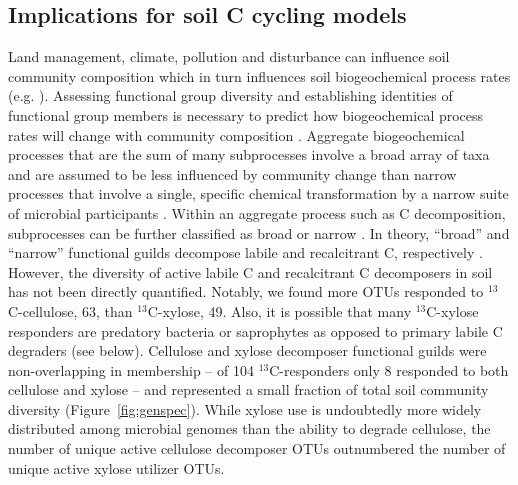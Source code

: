 \subsection{Implications for soil C cycling models}
Land management, climate, pollution and disturbance can influence soil
community composition \citep{McGuire2010} which in turn influences soil
biogeochemical process rates (e.g. \citep{Berlemont2014a}). Assessing
functional group diversity and establishing identities of functional group
members is necessary to predict how biogeochemical process rates will change
with community composition \citep{Schimel_1995,McGuire2010}. Aggregate
biogeochemical processes that are the sum of many subprocesses involve a broad
array of taxa and are assumed to be less influenced by community change than
narrow processes that involve a single, specific chemical transformation by
a narrow suite of microbial participants \citep{Schimel_1995,McGuire2010}.
Within an aggregate process such as C decomposition, subprocesses can be
further classified as broad or narrow \citep{McGuire2010}. In theory, ``broad''
and ``narrow'' functional guilds decompose labile and recalcitrant C,
respectively \citep{McGuire2010}. However, the diversity of active labile C and
recalcitrant C decomposers in soil has not been directly quantified. Notably,
we found more OTUs responded to $^{13}$C-cellulose, 63, than $^{13}$C-xylose,
49. Also, it is possible that many $^{13}$C-xylose responders are predatory
bacteria or saprophytes as opposed to primary labile C degraders (see below).
Cellulose and xylose decomposer functional guilds were non-overlapping in
membership -- of
104 $^{13}$C-responders only 8 responded to both cellulose and xylose -- and
represented a small fraction of total soil community diversity
(Figure~\ref{fig:genspec}). While xylose use is undoubtedly more widely
distributed among microbial genomes than the ability to degrade cellulose, the
number of unique active cellulose decomposer OTUs outnumbered the number of
unique active xylose utilizer OTUs.


